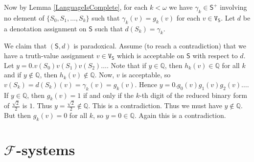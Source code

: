\documentclass[12pt]{kluwer}
\theoremstyle{remark}
\newcommand{\fancy}[1]{\mathcal{#1}}
\def\S{\textsf{S}}
\def\V{\texttt{V}}
\def\F{\fancy{F}}
\def\F{\fancy{F}}
\begin{document}
Now by Lemma \ref{LanguageIsComplete}, for each $k < \omega$ we have $\gamma_k \in \S^+$ involving no element of $\{S_{0}, S_{1}, \ldots, S_{k}\}$ such that $\gamma_k(v) = g_k(v)$ for each $v \in \V_\S$.  Let $d$ be a denotation assignment on $\S$ such that $d(S_k) = \gamma_k$.\newline

We claim that $(\S, d)$ is paradoxical.  Assume (to reach a contradiction) that we have a truth-value assignment $v \in \V_\S$ which is acceptable on $\S$ with respect to $d$. Let $y = 0.v(S_{0})v(S_{1})v(S_{2})\ldots$. Note that if $y \in \mathbb{Q}$, then $h_k(v) \in \mathbb{Q}$ for all $k$ and if $y \not \in \mathbb{Q}$, then $h_k(v) \not \in \mathbb{Q}$.  Now, $v$ is acceptable, so $v(S_k) = d(S_k)(v) = \gamma_k(v) = g_k(v)$.  Hence $y = 0.g_0(v)g_1(v)g_2(v)\ldots$.  If $y \in \mathbb{Q}$, then $g_k(v) = 1$ if and only if the $k$-th digit of the reduced binary form of $\frac{\sqrt{2}}{2}$ is $1$.  Thus $y = \frac{\sqrt{2}}{2} \not \in \mathbb{Q}$.  This is a contradiction.  Thus we must have $y \not \in \mathbb{Q}$.  But then $g_k(v) = 0$ for all $k$, so $y = 0 \in \mathbb{Q}$.  Again this is a contradiction.

\section{$\F$-systems}
\label{f-systems}
\end{document}

